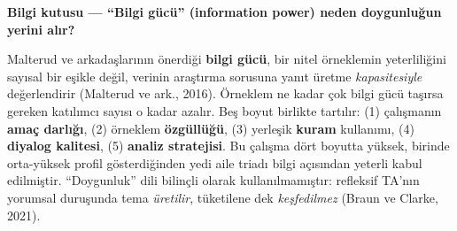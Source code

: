 \documentclass[
  turkish,
  a4paper,
  DIV=11,
  numbers=noendperiod]{scrreprt}
\begin{document}
\begin{tcolorbox}[enhanced jigsaw, arc=.35mm, bottomrule=.15mm, bottomtitle=1mm, breakable, colback=white, colbacktitle=quarto-callout-note-color!10!white, colframe=quarto-callout-note-color-frame, coltitle=black, left=2mm, leftrule=.75mm, opacityback=0, opacitybacktitle=0.6, rightrule=.15mm, title=\textcolor{quarto-callout-note-color}{\faInfo}\hspace{0.5em}{Not}, titlerule=0mm, toprule=.15mm, toptitle=1mm]

\textbf{Bilgi kutusu --- ``Bilgi gücü'' (information power) neden
doygunluğun yerini alır?}

Malterud ve arkadaşlarının önerdiği \textbf{bilgi gücü}, bir nitel
örneklemin yeterliliğini sayısal bir eşikle değil, verinin araştırma
sorusuna yanıt üretme \emph{kapasitesiyle} değerlendirir (Malterud ve
ark., 2016). Örneklem ne kadar çok bilgi gücü taşırsa gereken katılımcı
sayısı o kadar azalır. Beş boyut birlikte tartılır: (1) çalışmanın
\textbf{amaç darlığı}, (2) örneklem \textbf{özgüllüğü}, (3) yerleşik
\textbf{kuram} kullanımı, (4) \textbf{diyalog kalitesi}, (5)
\textbf{analiz stratejisi}. Bu çalışma dört boyutta yüksek, birinde
orta-yüksek profil gösterdiğinden yedi aile triadı bilgi açısından
yeterli kabul edilmiştir. ``Doygunluk'' dili bilinçli olarak
kullanılmamıştır: refleksif TA'nın yorumsal duruşunda tema
\emph{üretilir}, tüketilene dek \emph{keşfedilmez} (Braun ve Clarke,
2021).

\end{tcolorbox}
\end{document}
